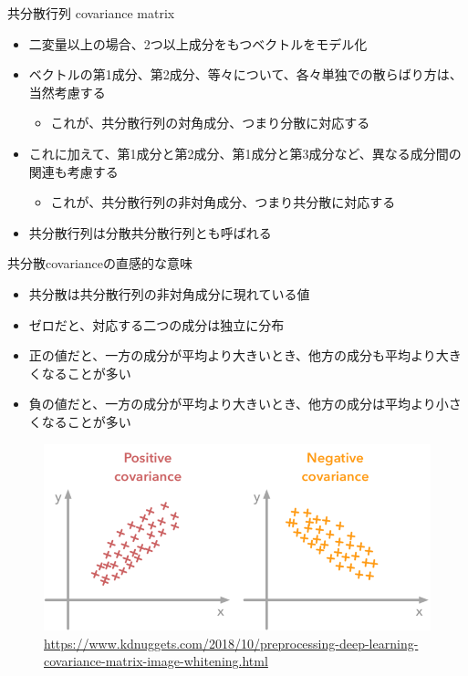 \documentclass[aspectratio=169,unicode,dvipdfmx,14pt]{beamer}
\begin{document}
\begin{frame}{共分散行列 covariance matrix}
\begin{itemize}
\item 二変量以上の場合、2つ以上成分をもつベクトルをモデル化
\item ベクトルの第1成分、第2成分、等々について、各々単独での散らばり方は、当然考慮する
\begin{itemize}
\item これが、共分散行列の対角成分、つまり分散に対応する
\end{itemize}
\item これに加えて、第1成分と第2成分、第1成分と第3成分など、異なる成分間の関連も考慮する
\begin{itemize}
\item これが、共分散行列の非対角成分、つまり共分散に対応する
\end{itemize}
\item 共分散行列は分散共分散行列とも呼ばれる
\end{itemize}
\end{frame}

\begin{frame}{共分散covarianceの直感的な意味}
\begin{itemize}
\item 共分散は共分散行列の非対角成分に現れている値
\item ゼロだと、対応する二つの成分は独立に分布
\item 正の値だと、一方の成分が平均より大きいとき、他方の成分も平均より大きくなることが多い
\item 負の値だと、一方の成分が平均より大きいとき、他方の成分は平均より小さくなることが多い
\end{itemize}
\end{frame}

\begin{frame}
\begin{figure}[t]
\begin{center}
\includegraphics[scale=0.5]{1_GH0ou22oJEwAw89GkrS8-w.png}
\href{https://www.kdnuggets.com/2018/10/preprocessing-deep-learning-covariance-matrix-image-whitening.html}{\tiny\url{https://www.kdnuggets.com/2018/10/preprocessing-deep-learning-covariance-matrix-image-whitening.html}}
\label{}
\end{center}
\end{figure}
\end{frame}
\end{document}
